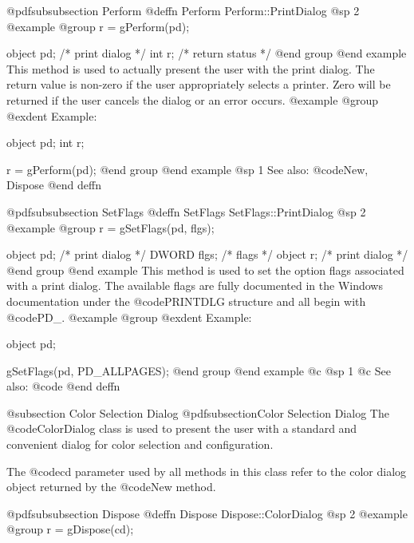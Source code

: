 @pdfsubsubsection {Perform}
@deffn {Perform} Perform::PrintDialog
@sp 2
@example
@group
r = gPerform(pd);

object  pd;     /*  print dialog   */
int     r;      /*  return status  */
@end group
@end example
This method is used to actually present the user with the print dialog.
The return value is non-zero if the user appropriately selects a printer.
Zero will be returned if the user cancels the dialog or an error occurs.
@example
@group
@exdent Example:

object  pd;
int     r;

r = gPerform(pd);
@end group
@end example
@sp 1
See also:  @code{New, Dispose}
@end deffn







@pdfsubsubsection {SetFlags}
@deffn {SetFlags} SetFlags::PrintDialog
@sp 2
@example
@group
r = gSetFlags(pd, flgs);

object  pd;     /*  print dialog  */
DWORD   flgs;   /*  flags         */
object  r;      /*  print dialog  */
@end group
@end example
This method is used to set the option flags associated with a print dialog.
The available flags are fully documented in the Windows documentation
under the @code{PRINTDLG} structure and all begin with @code{PD_}.
@example
@group
@exdent Example:

object  pd;

gSetFlags(pd, PD_ALLPAGES);
@end group
@end example
@c @sp 1
@c See also:  @code{}
@end deffn














@subsection Color Selection Dialog
@pdfsubsection{Color Selection Dialog}
The @code{ColorDialog} class is used to present the user with a standard
and convenient dialog for color selection and configuration.

The @code{cd} parameter used by all methods in this class refer to
the color dialog object returned by the @code{New} method.









@pdfsubsubsection {Dispose}
@deffn {Dispose} Dispose::ColorDialog
@sp 2
@example
@group
r = gDispose(cd);

